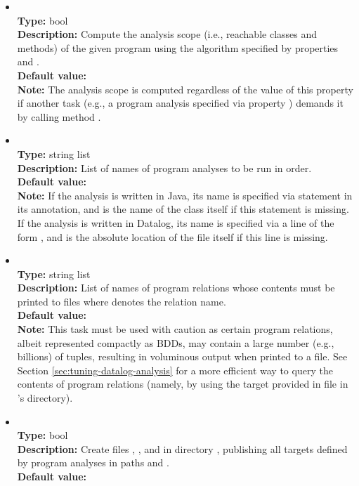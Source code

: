 \begin{itemize}
\item
{} \\
{\bf Type:} bool \\
{\bf Description:} Compute the analysis scope (i.e., reachable classes and methods) of the given program using the algorithm specified by properties  and . \\
{\bf Default value:}  \\
{\bf Note:} The analysis scope is computed regardless of the value of this property if another task
(e.g., a program analysis specified via property ) demands it by
calling method .

\item
{} \\
{\bf Type:} string list \\
{\bf Description:} List of names of program analyses to be run in order. \\
{\bf Default value:}  \\
{\bf Note:} If the analysis is written in Java, its name is specified via statement  in its  annotation, and is the name of the class itself if this statement is missing.  If the analysis is written in Datalog, its name is specified via a line of the form  , and is the absolute location of the file itself if this line is missing.

\item
{} \\
{\bf Type:} string list \\
{\bf Description:} List of names of program relations whose contents must be printed to files  where  denotes the relation name. \\
{\bf Default value:}  \\
{\bf Note:} This task must be used with caution as certain program relations, albeit represented compactly as BDDs, may contain a large number (e.g., billions) of tuples, resulting in voluminous output when printed to a file.  See Section \ref{sec:tuning-datalog-analysis} for a more efficient way to query the contents of program relations (namely, by using the  target provided in file  in \Chord's  directory).

\item
{} \\
{\bf Type:} bool \\
{\bf Description:} Create files , , and  in directory , publishing all targets defined by program analyses in paths  and . \\
{\bf Default value:} 
\end{itemize}

